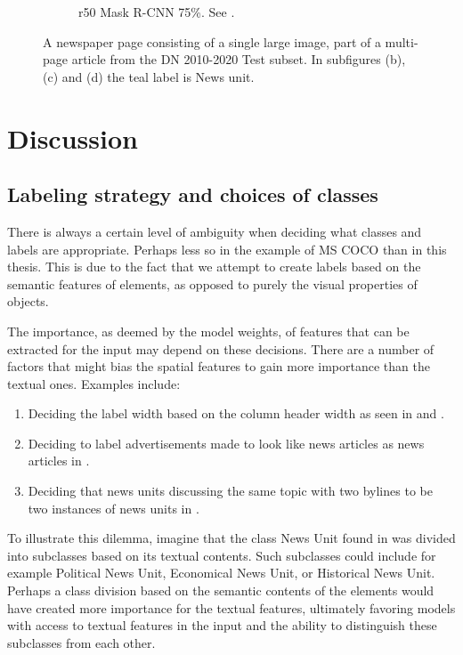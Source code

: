 \documentclass[oneside, english, bibtex]{kththesis}
\begin{document}
\begin{figure}[!htb]
\begin{adjustbox}{center}
{\begin{subfigure}{0.75\textwidth}
  \caption{r50 Mask R-CNN 75\%. See . }
  \label{fig:1RoKim0_pred}
\end{subfigure}}
\end{adjustbox}
  \caption{A newspaper page consisting of a single large image, part of a multi-page article from the DN 2010-2020 Test subset. In subfigures (b), (c) and (d) the teal label is News unit.}
\label{fig:1RoKim0}
\end{figure}

\chapter{Discussion}
\label{ch:disc}


\section{Labeling strategy and choices of classes}

There is always a certain level of ambiguity when deciding what classes and labels are appropriate. Perhaps less so in the example of MS COCO than in this thesis. This is due to the fact that we attempt to create labels based on the semantic features of elements, as opposed to purely the visual properties of objects. 

The importance, as deemed by the model weights, of features that can be extracted for the input may depend on these decisions. There are a number of factors that might bias the spatial features to gain more importance than the textual ones. Examples include:

\begin{enumerate}
\item Deciding the label width based on the column header width as seen in  and . 
\item Deciding to label advertisements made to look like news articles as news articles in .
\item Deciding that news units discussing the same topic with two bylines to be two instances of news units in .
\end{enumerate}

To illustrate this dilemma, imagine that the class News Unit found in  was divided into subclasses based on its textual contents. Such subclasses could include for example Political News Unit, Economical News Unit, or Historical News Unit. Perhaps a class division based on the semantic contents of the elements would have created more importance for the textual features, ultimately favoring models with access to textual features in the input and the ability to distinguish these subclasses from each other.
\end{document}
